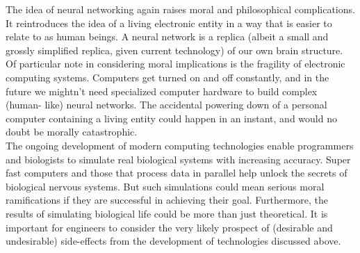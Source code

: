 The idea of neural networking again raises moral and philosophical
complications. It reintroduces the idea of a living electronic entity in a way that is easier to relate to as human beings. A neural network is a replica (albeit a small and grossly
simplified replica, given current technology) of our own brain structure. Of particular
note in considering moral implications is the fragility of electronic computing systems.
Computers get turned on and off constantly, and in the future we mightn’t need
specialized computer hardware to build complex (human- like) neural networks. The
accidental powering down of a personal computer containing a living entity could happen
in an instant, and would no doubt be morally catastrophic.\\
The ongoing development of modern computing technologies enable
programmers and biologists to simulate real biological systems with increasing accuracy.
Super fast computers and those that process data in parallel help unlock the secrets of
biological nervous systems. But such simulations could mean serious moral
ramifications if they are successful in achieving their goal. Furthermore, the results of
simulating biological life could be more than just theoretical. It is important for
engineers to consider the very likely prospect of (desirable and undesirable) side-effects
from the development of technologies discussed above.





















